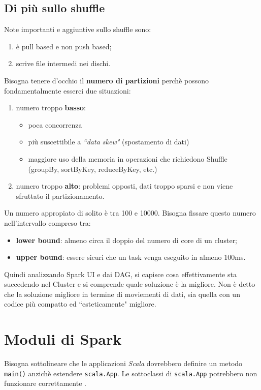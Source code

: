 \documentclass[12pt,italian]{article}
\begin{document}
\subsection{Di più sullo shuffle}
Note importanti e aggiuntive sullo shuffle sono:
\begin{enumerate}
	\item è pull based e non push based;
	\item scrive file intermedi nei dischi.
\end{enumerate}
Bisogna tenere d'occhio il \textbf{numero di partizioni} perchè possono fondamentalmente esserci due situazioni:
\begin{enumerate}
	\item numero troppo \textbf{basso}:
	\begin{itemize}
		\item poca concorrenza
		\item più suscettibile a \textit{``data skew"} (spostamento di dati)
		\item maggiore uso della memoria in operazioni che richiedono Shuffle (groupBy, sortByKey, reduceByKey, etc.)
	\end{itemize}
	\item numero troppo \textbf{alto}: problemi opposti, dati troppo sparsi e non viene sfruttato il partizionamento.
\end{enumerate}
Un numero appropiato di solito è tra 100 e 10000.
Bisogna fissare questo numero nell'intervallo compreso tra:
\begin{itemize}
	\item \textbf{lower bound}:  almeno circa il doppio del numero di core di un cluster;
	\item \textbf{upper bound}: essere sicuri che un task venga eseguito in almeno 100ms.
\end{itemize}
Quindi analizzando Spark UI e dai DAG, si capisce cosa effettivamente sta succedendo nel Cluster e si comprende quale soluzione è la migliore. Non è detto che la soluzione migliore in termine di moviementi di dati, sia quella con un codice più compatto ed ``esteticamente" migliore.
\section{Moduli di Spark}
Bisogna sottolineare che le applicazioni \textit{Scala} dovrebbero definire un metodo \texttt{main()} anzichè estendere \texttt{scala.App}. Le sottoclassi di \texttt{scala.App} potrebbero non funzionare correttamente \cite{spark}.
\end{document}
